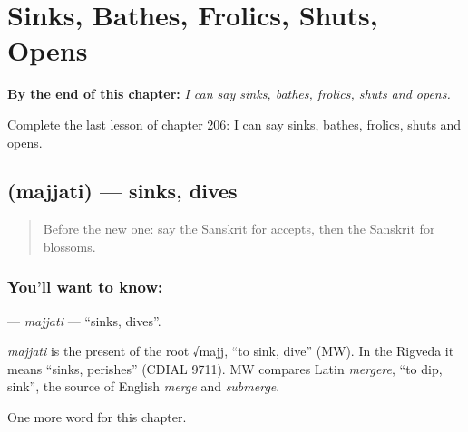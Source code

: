 
\chapter{Sinks, Bathes, Frolics, Shuts, Opens}
\label{ch:sa-sinks-bathes-frolics-shuts-opens}

\begin{chapteropening}
\textbf{By the end of this chapter:} \emph{I can say sinks, bathes, frolics, shuts and opens.}

Complete the last lesson of chapter 206: I can say sinks, bathes, frolics, shuts and opens.
\end{chapteropening}

\section[\texorpdfstring{\sk{मज्जति} (majjati)}{मज्जति (majjati)}]{ (majjati) — sinks, dives}

\label{lesson:SA-C206-majjati}



\begin{quote}
Before the new one: say the Sanskrit for accepts, then the Sanskrit for blossoms.
\end{quote}

\subsection*{You'll want to know: }
\textbf{} — \emph{majjati} — \textquotedblleft{}sinks, dives\textquotedblright{}.

\begin{cousinweb}
\emph{majjati} is the present of the root √majj, \textquotedblleft{}to sink, dive\textquotedblright{} (MW). In the Rigveda it means \textquotedblleft{}sinks, perishes\textquotedblright{} (CDIAL 9711). MW compares Latin \emph{mergere}, \textquotedblleft{}to dip, sink\textquotedblright{}, the source of English \emph{merge} and \emph{submerge}.
\end{cousinweb}

\begin{grammarlens}[title={What you've built}]
One more word for this chapter.
\end{grammarlens}

